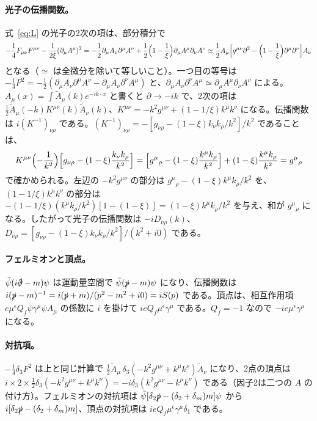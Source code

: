 \documentclass[a4paper,10pt]{ltjsarticle}
\begin{document}
\paragraph{光子の伝播関数。}式~\eqref{eq:L} の光子の2次の項は、部分積分で
\begin{equation*}
-\frac14F_{\mu\nu}F^{\mu\nu}-\frac{1}{2\xi}(\partial_\mu A^\mu)^2
=-\frac12\partial_\mu A_\nu\partial^\mu A^\nu+\frac12\Bigl(1-\frac1\xi\Bigr)\partial_\mu A^\mu\partial_\nu A^\nu
\simeq\frac12A_\mu\Bigl[g^{\mu\nu}\partial^2-\Bigl(1-\frac1\xi\Bigr)\partial^\mu\partial^\nu\Bigr]A_\nu
\end{equation*}
となる（$\simeq$ は全微分を除いて等しいこと）。一つ目の等号は $-\frac14F^2=-\frac12(\partial_\mu A_\nu\partial^\mu A^\nu-\partial_\mu A_\nu\partial^\nu A^\mu)$ と、$\partial_\mu A_\nu\partial^\nu A^\mu\simeq\partial_\mu A^\mu\partial_\nu A^\nu$ による。$A_\mu(x)=\int\tilde A_\mu(k)e^{-ik\cdot x}$ と書くと $\partial\to-ik$ で、2次の項は $\frac12\tilde A_\mu(-k)K^{\mu\nu}(k)\tilde A_\nu(k)$、$K^{\mu\nu}=-k^2g^{\mu\nu}+(1-1/\xi)k^\mu k^\nu$ になる。伝播関数は $i(K^{-1})_{\nu\rho}$ である。$(K^{-1})_{\nu\rho}=-[g_{\nu\rho}-(1-\xi)k_\nu k_\rho/k^2]/k^2$ であることは、
\begin{equation*}
K^{\mu\nu}\Bigl(-\frac{1}{k^2}\Bigr)\Bigl[g_{\nu\rho}-(1-\xi)\frac{k_\nu k_\rho}{k^2}\Bigr]
=\Bigl[g^\mu{}_\rho-(1-\xi)\frac{k^\mu k_\rho}{k^2}\Bigr]+(1-\xi)\frac{k^\mu k_\rho}{k^2}=g^\mu{}_\rho
\end{equation*}
で確かめられる。左辺の $-k^2g^{\mu\nu}$ の部分は $g^\mu{}_\rho-(1-\xi)k^\mu k_\rho/k^2$ を、$(1-1/\xi)k^\mu k^\nu$ の部分は $-(1-1/\xi)(k^\mu k_\rho/k^2)[1-(1-\xi)]=(1-\xi)k^\mu k_\rho/k^2$ を与え、和が $g^\mu{}_\rho$ になる。したがって光子の伝播関数は $-iD_{\nu\rho}(k)$、$D_{\nu\rho}=[g_{\nu\rho}-(1-\xi)k_\nu k_\rho/k^2]/(k^2+i0)$ である。

\paragraph{フェルミオンと頂点。}$\bar\psi(i\slashed\partial-m)\psi$ は運動量空間で $\bar\psi(\slashed p-m)\psi$ になり、伝播関数は $i(\slashed p-m)^{-1}=i(\slashed p+m)/(p^2-m^2+i0)=iS(p)$ である。頂点は、相互作用項 $e\mu^\epsilon Q_f\bar\psi\gamma^\mu\psi A_\mu$ の係数に $i$ を掛けて $ieQ_f\mu^\epsilon\gamma^\mu$ である。$Q_f=-1$ なので $-ie\mu^\epsilon\gamma^\mu$ になる。

\paragraph{対抗項。}$-\frac14\delta_3F^2$ は上と同じ計算で $\frac12\tilde A_\mu\,\delta_3(-k^2g^{\mu\nu}+k^\mu k^\nu)\tilde A_\nu$ になり、2点の頂点は $i\times2\times\frac12\delta_3(-k^2g^{\mu\nu}+k^\mu k^\nu)=-i\delta_3(k^2g^{\mu\nu}-k^\mu k^\nu)$ である（因子2は二つの $A$ の付け方）。フェルミオンの対抗項は $\bar\psi[\delta_2\slashed p-(\delta_2+\delta_m)m]\psi$ から $i[\delta_2\slashed p-(\delta_2+\delta_m)m]$、頂点の対抗項は $ieQ_f\mu^\epsilon\gamma^\mu\delta_1$ である。
\end{document}
